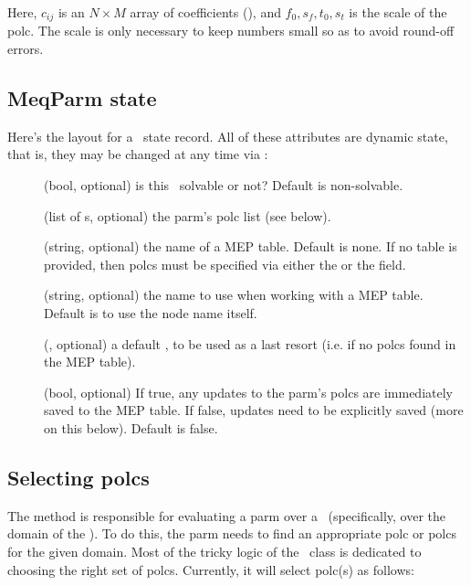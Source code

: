  Here, $c_{ij}$ is an $N\times M$ array of coefficients (), and
  $f_0,s_f,t_0,s_t$ is the scale of the polc. The scale is only necessary to
  keep numbers small so as to avoid round-off errors.

\subsection{MeqParm state}

  Here's the layout for a \Parm\ state record. All of these attributes are
  dynamic state, that is, they may be changed at any time via :
  
  \begin{description}

  \item[] (bool, optional) is this \Parm\ solvable or not?
    Default is non-solvable.

  \item[] (list of \Polc{}s, optional) the parm's polc list (see below).

  \item[] (string, optional) the name of a MEP table. Default is none.
    If no table is provided, then polcs must be specified via either the
     or the  field.

  \item[] (string, optional) the name to use when working with a MEP
    table. Default is to use the node name itself.

  \item[] (\Polc, optional) a default \Polc, to be used as a last
    resort (i.e. if no polcs found in the MEP table).

  \item[] (bool, optional) If true, any updates to the parm's 
    polcs are immediately saved to the MEP table. If false, updates need to be
    explicitly saved (more on this below). Default is false.

  \end{description}
  
\subsection{Selecting polcs}

  The  method is responsible for evaluating a parm over a
  \Cells\ (specifically, over the domain of the \Cells). To do this, the parm
  needs to find an appropriate polc or polcs for the given domain. Most of the
  tricky logic of the \Parm\ class is dedicated to choosing the right set of
  polcs.  Currently, it will select polc(s) as follows:

